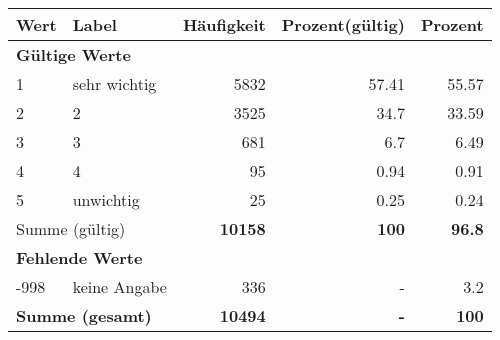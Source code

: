      \begin{longtable}{lXrrr}
     \toprule
     \textbf{Wert} & \textbf{Label} & \textbf{Häufigkeit} & \textbf{Prozent(gültig)} & \textbf{Prozent} \\
     \endhead
     \midrule
     \multicolumn{5}{l}{\textbf{Gültige Werte}}\\

     1 &
     \multicolumn{1}{X}{ sehr wichtig   } &


       \num{5832} &
       \num[round-mode=places,round-precision=2]{57,41} &
         \num[round-mode=places,round-precision=2]{55,57} \\

     2 &
     \multicolumn{1}{X}{ 2   } &


       \num{3525} &
       \num[round-mode=places,round-precision=2]{34,7} &
         \num[round-mode=places,round-precision=2]{33,59} \\

     3 &
     \multicolumn{1}{X}{ 3   } &


       \num{681} &
       \num[round-mode=places,round-precision=2]{6,7} &
         \num[round-mode=places,round-precision=2]{6,49} \\

     4 &
     \multicolumn{1}{X}{ 4   } &


       \num{95} &
       \num[round-mode=places,round-precision=2]{0,94} &
         \num[round-mode=places,round-precision=2]{0,91} \\

     5 &
     \multicolumn{1}{X}{ unwichtig   } &


       \num{25} &
       \num[round-mode=places,round-precision=2]{0,25} &
         \num[round-mode=places,round-precision=2]{0,24} \\
     \midrule
     \multicolumn{2}{l}{Summe (gültig)} &
       \textbf{\num{10158}} &
     \textbf{100} &
       \textbf{\num[round-mode=places,round-precision=2]{96,8}} \\
     \multicolumn{5}{l}{\textbf{Fehlende Werte}}\\
       -998 &
       keine Angabe &
         \num{336} &
        - &
         \num[round-mode=places,round-precision=2]{3,2} \\
     \midrule
     \multicolumn{2}{l}{\textbf{Summe (gesamt)}} &
          \textbf{\num{10494}} &
        \textbf{-} &
        \textbf{100} \\
     \bottomrule
     \end{longtable}
     
